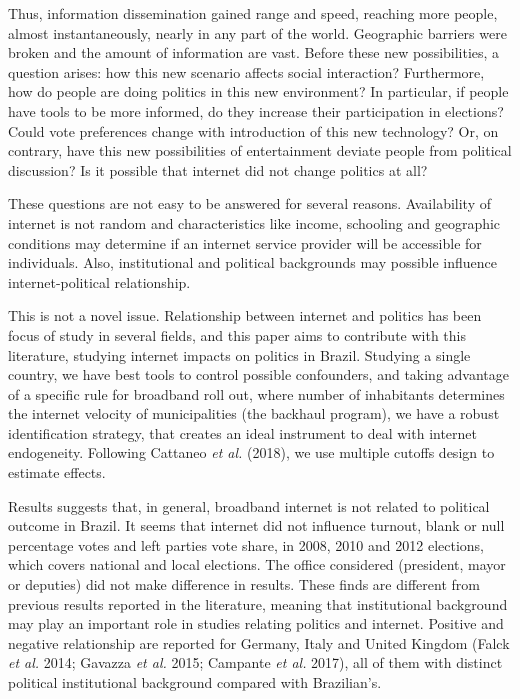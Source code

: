 \documentclass[
  12pt,
]{article}
\begin{document}
Thus, information dissemination gained range and speed, reaching more
people, almost instantaneously, nearly in any part of the world.
Geographic barriers were broken and the amount of information are vast.
Before these new possibilities, a question arises: how this new scenario
affects social interaction? Furthermore, how do people are doing
politics in this new environment? In particular, if people have tools to
be more informed, do they increase their participation in elections?
Could vote preferences change with introduction of this new technology?
Or, on contrary, have this new possibilities of entertainment deviate
people from political discussion? Is it possible that internet did not
change politics at all?

These questions are not easy to be answered for several reasons.
Availability of internet is not random and characteristics like income,
schooling and geographic conditions may determine if an internet service
provider will be accessible for individuals. Also, institutional and
political backgrounds may possible influence internet-political
relationship.

This is not a novel issue. Relationship between internet and politics
has been focus of study in several fields, and this paper aims to
contribute with this literature, studying internet impacts on politics
in Brazil. Studying a single country, we have best tools to control
possible confounders, and taking advantage of a specific rule for
broadband roll out, where number of inhabitants determines the internet
velocity of municipalities (the backhaul program), we have a robust
identification strategy, that creates an ideal instrument to deal with
internet endogeneity. Following Cattaneo \emph{et al.} (2018), we use
multiple cutoffs design to estimate effects.

Results suggests that, in general, broadband internet is not related to
political outcome in Brazil. It seems that internet did not influence
turnout, blank or null percentage votes and left parties vote share, in
2008, 2010 and 2012 elections, which covers national and local
elections. The office considered (president, mayor or deputies) did not
make difference in results. These finds are different from previous
results reported in the literature, meaning that institutional
background may play an important role in studies relating politics and
internet. Positive and negative relationship are reported for Germany,
Italy and United Kingdom (Falck \emph{et al.} 2014; Gavazza \emph{et
al.} 2015; Campante \emph{et al.} 2017), all of them with distinct
political institutional background compared with Brazilian's.
\end{document}
